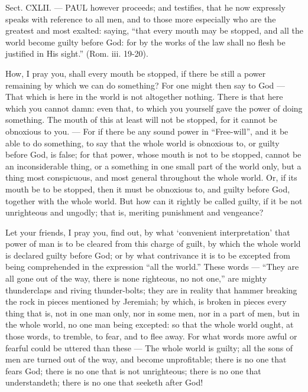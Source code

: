 
Sect. CXLII. — PAUL however proceeds; and testifies, that he now expressly speaks with reference to all men, and to those more especially who are the greatest and most exalted: saying, “that every mouth may be stopped, and all the world become guilty before God: for by the works of the law shall no flesh be justified in His sight.” (Rom. iii. 19-20).

How, I pray you, shall every mouth be stopped, if there be still a power remaining by which we can do something? For one might then say to God — That which is here in the world is not altogether nothing. There is that here which you cannot damn: even that, to which you yourself gave the power of doing something. The mouth of this at least will not be stopped, for it cannot be obnoxious to you. — For if there be any sound power in “Free-will”, and it be able to do something, to say that the whole world is obnoxious to, or guilty before God, is false; for that power, whose mouth is not to be stopped, cannot be an inconsiderable thing, or a something in one small part of the world only, but a thing most conspicuous, and most general throughout the whole world. Or, if its mouth be to be stopped, then it must be obnoxious to, and guilty before God, together with the whole world. But how can it rightly be called guilty, if it be not unrighteous and ungodly; that is, meriting punishment and vengeance?

Let your friends, I pray you, find out, by what ‘convenient interpretation’ that power of man is to be cleared from this charge of guilt, by which the whole world is declared guilty before God; or by what contrivance it is to be excepted from being comprehended in the expression “all the world.” These words — “They are all gone out of the way, there is none righteous, no not one,” are mighty thunderclaps and riving thunder-bolts; they are in reality that hammer breaking the rock in pieces mentioned by Jeremiah; by which, is broken in pieces every thing that is, not in one man only, nor in some men, nor in a part of men, but in the whole world, no one man being excepted: so that the whole world ought, at those words, to tremble, to fear, and to flee away. For what words more awful or fearful could be uttered than these — The whole world is guilty; all the sons of men are turned out of the way, and become unprofitable; there is no one that fears God; there is no one that is not unrighteous; there is no one that understandeth; there is no one that seeketh after God!

